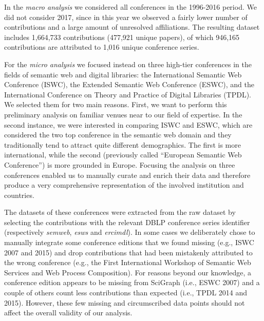 \documentclass{llncs}
\begin{document}
In the \textit{macro analysis} we considered all conferences in the 1996-2016 period. We did not consider 2017, since in this year we observed a fairly lower number of contributions and a large amount of unresolved affiliations.
The resulting dataset includes 1,664,733 contributions (477,921 unique papers), of which 946,165 contributions are attributed to 1,016 unique conference series.

For the \textit{micro analysis} we focused instead on three high-tier conferences in the fields of semantic web and digital libraries: the International Semantic Web Conference (ISWC), the Extended Semantic Web Conference (ESWC), and the International Conference on Theory and Practice of Digital Libraries (TPDL).
We selected them for two main reasons. First, we want to perform this preliminary analysis on familiar venues near to our field of expertise.
In the second instance, we were interested in comparing ISWC and ESWC, which are considered the two top conference in the semantic web domain and they traditionally tend to attract quite different demographics. 
The first is more international, while the second (previously called ``European Semantic Web Conference'') is more grounded in Europe.
Focusing the analysis on three conferences enabled us to manually curate and enrich their data and therefore produce a very comprehensive representation of the involved institution and countries.

The datasets of these conferences were extracted from the raw dataset by selecting the contributions with the relevant DBLP conference series identifier (respectively \textit{semweb}, \textit{esws} and \textit{ercimdl}). 
In some cases we deliberately chose to manually integrate some conference editions that we found missing (e.g., ISWC 2007 and 2015) and drop contributions that had been mistakenly attributed to the wrong conference 
(e.g., the First International Workshop of Semantic Web Services and Web Process Composition).
For reasons beyond our knowledge, a conference edition appears to be missing from SciGraph (i.e., ESWC 2007) and a couple of others count less contributions than expected (i.e., TPDL 2014 and 2015). 
However, these few missing and circumscribed data points should not affect the overall validity of our analysis.
\end{document}
